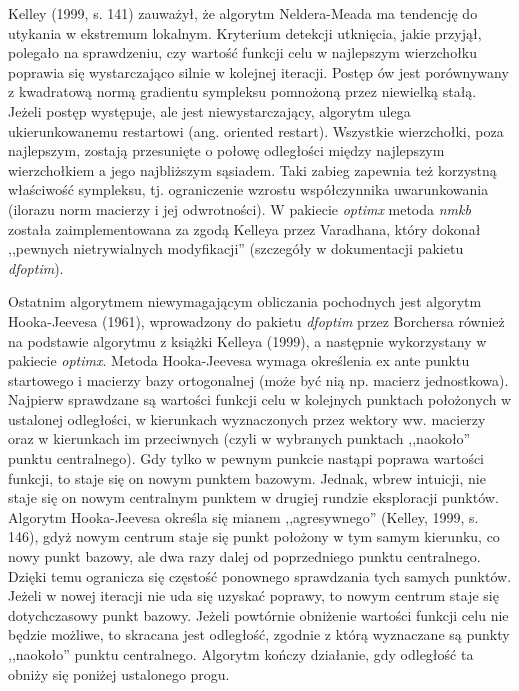 Kelley (1999, s. 141) zauważył, że algorytm Neldera-Meada ma tendencję do utykania w ekstremum lokalnym. Kryterium detekcji utknięcia, jakie przyjął, polegało na sprawdzeniu, czy wartość funkcji celu w najlepszym wierzchołku poprawia się wystarczająco silnie w kolejnej iteracji. Postęp ów jest porównywany z kwadratową normą gradientu sympleksu pomnożoną przez niewielką stałą. Jeżeli postęp występuje, ale jest niewystarczający, algorytm ulega ukierunkowanemu restartowi (ang. oriented restart). Wszystkie wierzchołki, poza najlepszym, zostają przesunięte o połowę odległości między najlepszym wierzchołkiem a jego najbliższym sąsiadem. Taki zabieg zapewnia też korzystną właściwość sympleksu, tj. ograniczenie wzrostu współczynnika uwarunkowania (ilorazu norm macierzy i jej odwrotności). W pakiecie \textit{optimx} metoda \textit{nmkb} została zaimplementowana za zgodą Kelleya przez Varadhana, który dokonał ,,pewnych nietrywialnych modyfikacji'' (szczegóły w dokumentacji pakietu \textit{dfoptim}\nocite{dfoptim}).

Ostatnim algorytmem niewymagającym obliczania pochodnych jest algorytm Hooka-Jeevesa (1961)\nocite{Hooke_Jeeves_1961}, wprowadzony do pakietu \textit{dfoptim} przez Borchersa również na podstawie algorytmu z książki Kelleya (1999), a następnie wykorzystany w pakiecie \textit{optimx}. Metoda Hooka-Jeevesa wymaga określenia ex ante punktu startowego i macierzy bazy ortogonalnej (może być nią np. macierz jednostkowa). Najpierw sprawdzane są wartości funkcji celu w kolejnych punktach położonych w ustalonej odległości, w kierunkach wyznaczonych przez wektory ww. macierzy oraz w kierunkach im przeciwnych (czyli w wybranych punktach ,,naokoło'' punktu centralnego). Gdy tylko w pewnym punkcie nastąpi poprawa wartości funkcji, to staje się on nowym punktem bazowym. Jednak, wbrew intuicji, nie staje się on nowym centralnym punktem w drugiej rundzie eksploracji punktów. Algorytm Hooka-Jeevesa określa się mianem ,,agresywnego'' (Kelley, 1999, s. 146), gdyż nowym centrum staje się punkt położony w tym samym kierunku, co nowy punkt bazowy, ale dwa razy dalej od poprzedniego punktu centralnego. Dzięki temu ogranicza się częstość ponownego sprawdzania tych samych punktów. Jeżeli w nowej iteracji nie uda się uzyskać poprawy, to nowym centrum staje się dotychczasowy punkt bazowy. Jeżeli powtórnie obniżenie wartości funkcji celu nie będzie możliwe, to skracana jest odległość, zgodnie z którą wyznaczane są punkty ,,naokoło'' punktu centralnego. Algorytm kończy działanie, gdy odległość ta obniży się poniżej ustalonego progu.        


